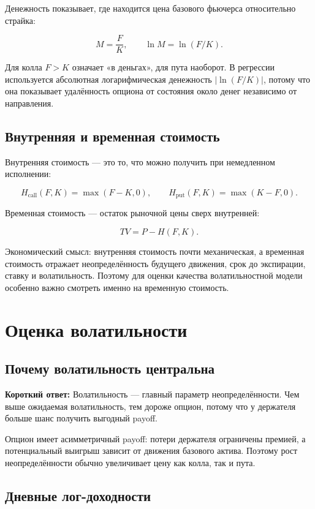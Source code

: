 \documentclass[11pt,a4paper]{article}
\newcommand{\answerbox}[1]{%
  \noindent\colorbox{softblue}{%
    \parbox{\dimexpr\linewidth-2\fboxsep\relax}{\textbf{Короткий ответ:} #1}%
  }\par\vspace{0.2em}
}
\begin{document}
Денежность показывает, где находится цена базового фьючерса относительно страйка:

\[
M=\frac{F}{K}, \qquad \ln M=\ln(F/K).
\]

Для колла $F>K$ означает «в деньгах», для пута наоборот. В регрессии используется абсолютная логарифмическая денежность $|\ln(F/K)|$, потому что она показывает удалённость опциона от состояния около денег независимо от направления.

\subsection{Внутренняя и временная стоимость}

Внутренняя стоимость --- это то, что можно получить при немедленном исполнении:

\[
H_{\text{call}}(F,K)=\max(F-K,0), \qquad
H_{\text{put}}(F,K)=\max(K-F,0).
\]

Временная стоимость --- остаток рыночной цены сверх внутренней:

\[
TV=P-H(F,K).
\]

Экономический смысл: внутренняя стоимость почти механическая, а временная стоимость отражает неопределённость будущего движения, срок до экспирации, ставку и волатильность. Поэтому для оценки качества волатильностной модели особенно важно смотреть именно на временную стоимость.

\section{Оценка волатильности}

\subsection{Почему волатильность центральна}

\answerbox{Волатильность --- главный параметр неопределённости. Чем выше ожидаемая волатильность, тем дороже опцион, потому что у держателя больше шанс получить выгодный payoff.}

Опцион имеет асимметричный payoff: потери держателя ограничены премией, а потенциальный выигрыш зависит от движения базового актива. Поэтому рост неопределённости обычно увеличивает цену как колла, так и пута.

\subsection{Дневные лог-доходности}
\end{document}
